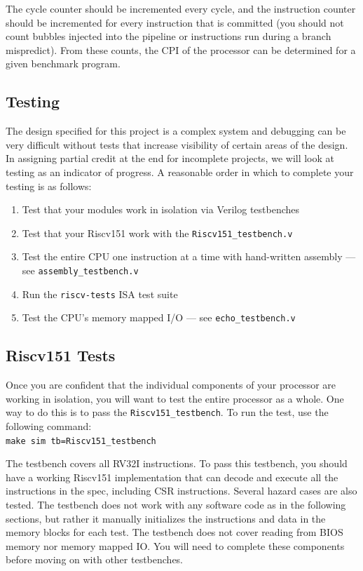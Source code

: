 \documentclass[11pt]{article}
\begin{document}
The cycle counter should be incremented every cycle, and the instruction counter should be incremented for every instruction that is committed (you should not count bubbles injected into the pipeline or instructions run during a branch mispredict).
From these counts, the CPI of the processor can be determined for a given benchmark program.

\subsection{Testing}
\label{testing}
The design specified for this project is a complex system and debugging can be very difficult without tests that increase visibility of certain areas of the design.
In assigning partial credit at the end for incomplete projects, we will look at testing as an indicator of progress.
A reasonable order in which to complete your testing is as follows:

\begin{enumerate}
  \item Test that your modules work in isolation via Verilog testbenches
  \item Test that your Riscv151 work with the \verb|Riscv151_testbench.v|
  \item Test the entire CPU one instruction at a time with hand-written assembly --- see \verb|assembly_testbench.v|
  \item Run the \verb|riscv-tests| ISA test suite
  \item Test the CPU's memory mapped I/O --- see \verb|echo_testbench.v|
\end{enumerate}

\subsection{Riscv151 Tests}

Once you are confident that the individual components of your processor are working in isolation, you will want to test the entire processor as a whole. One way to do this is to pass the \verb|Riscv151_testbench|. To run the test, use the following command:\\
\verb|make sim tb=Riscv151_testbench|

The testbench covers all RV32I instructions. To pass this testbench, you should have a working Riscv151 implementation that can decode and execute all the instructions in the spec, including CSR instructions. Several hazard cases are also tested. The testbench does not work with any software code as in the following sections, but rather it manually initializes the instructions and data in the memory blocks for each test. The testbench does not cover reading from BIOS memory nor memory mapped IO. You will need to complete these components before moving on with other testbenches.
\end{document}

